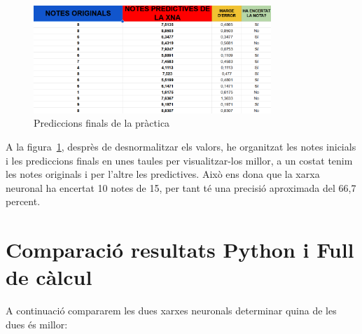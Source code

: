 \begin{figure}[h]
    \centering
    \includegraphics[width=0.8\textwidth]{./figures/Resultat_final.png}
    \caption{Prediccions finals de la pràctica}
    \label{f:resulat_full}
\end{figure}

A la figura~\ref{f:resulat_full}, desprès de desnormalitzar els valors, he organitzat les notes inicials i les prediccions finals en unes taules per visualitzar-los millor, a un costat tenim les notes originals i per l'altre les predictives.
Això ens dona que la xarxa neuronal ha encertat 10 notes de 15, per tant té una precisió aproximada del 66,7 percent.

\section{Comparació resultats Python i Full de càlcul}

A continuació compararem les dues xarxes neuronals determinar quina de les dues és millor:

